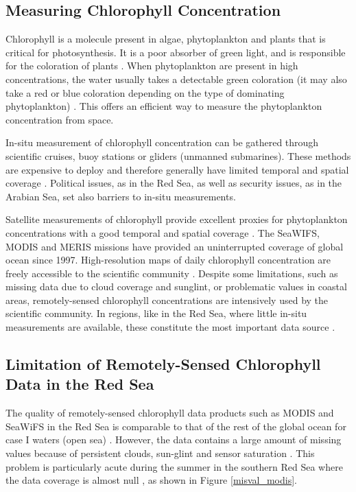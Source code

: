 \subsection{Measuring Chlorophyll Concentration}

Chlorophyll is a molecule present in algae, phytoplankton and plants that is
critical for photosynthesis. It is a poor absorber of green light, and is
responsible for the coloration of plants \citep{Pal2014}. When phytoplankton
are present in high concentrations, the water usually takes a detectable green
coloration (it may also take a red or blue coloration depending on the type of
dominating phytoplankton) \citep{Robinson2010}. This offers an efficient way to
measure the phytoplankton concentration from space.

In-situ measurement of chlorophyll concentration can be gathered through
scientific cruises, buoy stations or gliders (unmanned submarines). These
methods are expensive to deploy and therefore generally have limited temporal
and spatial coverage \citep{Robinson2010}. Political issues, as in the Red Sea,
as well as security issues, as in the Arabian Sea, set also barriers to in-situ
measurements.

Satellite measurements of chlorophyll provide excellent proxies for
phytoplankton concentrations with a good temporal and spatial coverage
\citep{Robinson2010}. The SeaWIFS, MODIS and MERIS missions have provided an
uninterrupted coverage of global ocean since 1997. High-resolution maps of
daily chlorophyll concentration are freely accessible to the scientific
community \citep{McClain2009}. Despite some limitations, such as missing data
due to cloud coverage and sunglint, or problematic values in coastal areas,
remotely-sensed chlorophyll concentrations are intensively used by the
scientific community. In regions, like in the Red Sea, where little in-situ
measurements are available, these constitute the most important data source
\citep{Raitsos2013, Brewin2013}.

\subsection{Limitation of Remotely-Sensed Chlorophyll Data in the Red Sea}

The quality of remotely-sensed chlorophyll data products such as MODIS and
SeaWiFS in the Red Sea is comparable to that of the rest of the global ocean for
case I waters (open sea) \citep{Brewin2013}. However, the data contains a large
amount of missing values because of persistent clouds, sun-glint and sensor
saturation \citep{Racault}. This problem is particularly acute during the
summer in the southern Red Sea where the data coverage is almost null
\citep{Racault}, as shown in Figure \ref{misval_modis}.

